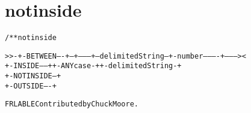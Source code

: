 \section{notinside}
\begin{shaded}
\begin{alltt}
/** notinside


   >>-+-BETWEEN----+--+---------+--delimitedString--+-number----------+---------><
      +-INSIDE-----+  +-ANYcase-+                   +-delimitedString-+
      +-NOTINSIDE--+
      +-OUTSIDE----+


  FRLABLE Contributed by Chuck Moore.

\end{alltt}
\end{shaded}
